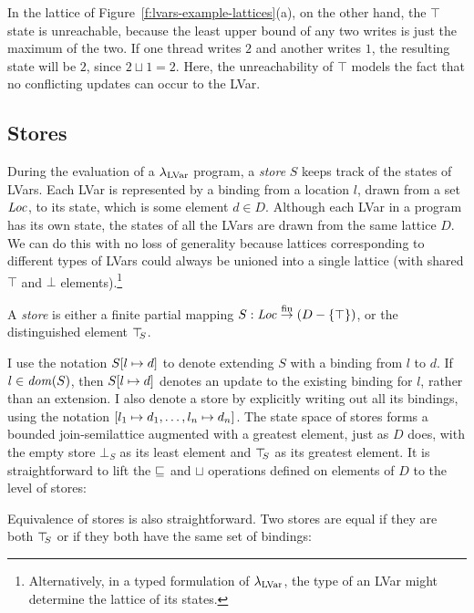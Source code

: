 In the lattice of Figure~\ref{f:lvars-example-lattices}(a), on the
other hand, the $\top$ state is unreachable, because the least upper
bound of any two writes is just the maximum of the two.  If one thread
writes $2$ and another writes $1$, the resulting state will be $2$,
since $2 \sqcup 1 = 2$.  Here, the unreachability of $\top$ models the
fact that no conflicting updates can occur to the LVar.

\subsection{Stores}\label{subsection:lvars-stores}

During the evaluation of a $\lambda_{\textrm{LVar}}$ program, a \emph{store} $S$
keeps track of the states of LVars.  Each LVar is represented by a
binding from a location $l$, drawn from a set $\mathit{Loc}$, to its state,
which is some element $d \in D$.  Although each LVar in a program has
its own state, the states of all the LVars are drawn from the same
lattice $D$.  We can do this with no loss of generality because
lattices corresponding to different types of LVars could always be
unioned into a single lattice (with shared $\top$ and $\bot$
elements).\footnote{Alternatively, in a typed formulation of
  $\lambda_{\textrm{LVar}}$, the type of an LVar might determine the lattice of
  its states.}

\begin{definition}\label{def:lvars-store}
A \emph{store} is either a finite partial mapping $S : \mathit{Loc} \stackrel{\textrm{fin}}{\rightarrow}
(D-\lbrace \top \rbrace)$, or the distinguished element $\top\hspace{-0.85mm}_{S}$.
\end{definition}

I use the notation $S[l \mapsto d]$ to denote extending $S$ with a
binding from $l$ to $d$.  If $l \in \mathit{dom}(S)$, then $S[l \mapsto d]$
denotes an update to the existing binding for $l$, rather than an
extension.  I also denote a store by explicitly writing out all its
bindings, using the notation $\left[ l_1 \mapsto d_1,
  \dots, l_n \mapsto d_n \right]$.  The state space of stores
forms a bounded join-semilattice augmented with a greatest element,
just as $D$ does, with the empty store $\bot_S$ as its least element
and $\top\hspace{-0.85mm}_{S}$ as its greatest element.  It is straightforward to lift
the $\sqsubseteq$ and $\sqcup$ operations defined on elements of $D$ to
the level of stores:

\LVarsDefLeqStore

\LVarsDefLubStore

Equivalence of stores is also straightforward.  Two stores are equal
if they are both $\top\hspace{-0.85mm}_{S}$ or if they both have the same set of
bindings:

